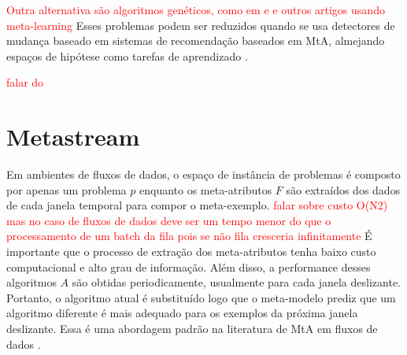 \textcolor{red}{Outra alternativa são algoritmos genéticos, como em \cite{kanade2010evolution} e \cite{kang2017visualising} e outros artigos usando meta-learning}
Esses problemas podem ser reduzidos quando se usa detectores de mudança baseado em sistemas de recomendação baseados em MtA, almejando espaços de hipótese como tarefas de aprendizado \cite{rossi2014metastream}.

\textcolor{red}{falar do \cite{talagala2018meta}}

\section{Metastream}
\label{sec:metastream}


Em ambientes de fluxos de dados, o espaço de instância de problemas é composto
por apenas um problema $p$ enquanto os meta-atributos $F$ são extraídos dos
dados de cada janela temporal para compor o meta-exemplo.
\textcolor{red}{falar sobre custo O(N2) mas no caso de fluxos de dados deve ser
um tempo menor do que o processamento de um batch da fila pois se não fila
cresceria infinitamente}
É importante que o processo de extração dos meta-atributos tenha baixo custo
computacional e alto grau de informação.
Além disso, a  performance desses algoritmos $A$ são obtidas periodicamente,
usualmente para cada janela deslizante.
Portanto, o algoritmo atual é substituído logo que o meta-modelo prediz que um
algoritmo diferente é mais adequado para os exemplos da próxima janela
deslizante.
Essa é uma abordagem padrão na literatura de MtA em fluxos de dados
\cite{read2012batch, vanrijn2014algorithm, Anderson2019}.

